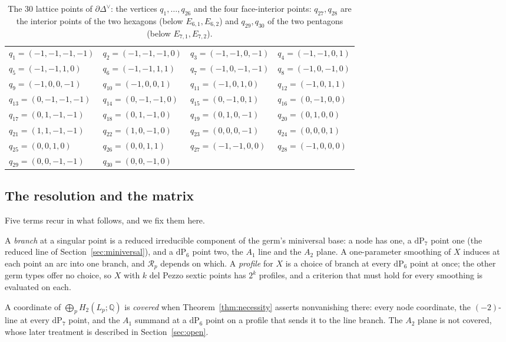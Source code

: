 \documentclass[11pt]{amsart}
\theoremstyle{definition}
\theoremstyle{remark}
\theoremstyle{plain}
\newcommand{\QQ}{\mathbb{Q}}
\newcommand{\Rsm}{\mathcal{R}}   %
\newcommand{\dP}{\mathrm{dP}}
\begin{document}
\begin{table}\centering
\caption{The $30$ lattice points of $\partial\Delta^{\vee}$: the
vertices $q_1,\dots,q_{26}$ and the four face-interior points:
$q_{27},q_{28}$ are the interior points of the two hexagons (below
$E_{6,1},E_{6,2}$) and $q_{29},q_{30}$ of the two pentagons (below
$E_{7,1},E_{7,2}$).}\label{tab:rays}
\begin{tabular}{llll}
\toprule
$q_1=(-1,-1,-1,-1)$ & $q_2=(-1,-1,-1,0)$ & $q_3=(-1,-1,0,-1)$ &
$q_4=(-1,-1,0,1)$\\
$q_5=(-1,-1,1,0)$ & $q_6=(-1,-1,1,1)$ & $q_7=(-1,0,-1,-1)$ &
$q_8=(-1,0,-1,0)$\\
$q_9=(-1,0,0,-1)$ & $q_{10}=(-1,0,0,1)$ & $q_{11}=(-1,0,1,0)$ &
$q_{12}=(-1,0,1,1)$\\
$q_{13}=(0,-1,-1,-1)$ & $q_{14}=(0,-1,-1,0)$ & $q_{15}=(0,-1,0,1)$ &
$q_{16}=(0,-1,0,0)$\\
$q_{17}=(0,1,-1,-1)$ & $q_{18}=(0,1,-1,0)$ & $q_{19}=(0,1,0,-1)$ &
$q_{20}=(0,1,0,0)$\\
$q_{21}=(1,1,-1,-1)$ & $q_{22}=(1,0,-1,0)$ & $q_{23}=(0,0,0,-1)$ &
$q_{24}=(0,0,0,1)$\\
$q_{25}=(0,0,1,0)$ & $q_{26}=(0,0,1,1)$ & $q_{27}=(-1,-1,0,0)$ &
$q_{28}=(-1,0,0,0)$\\
$q_{29}=(0,0,-1,-1)$ & $q_{30}=(0,0,-1,0)$ &&\\
\bottomrule
\end{tabular}
\end{table}

\subsection{The resolution and the matrix}\label{sec:matrix}
Five terms recur in what follows, and we fix them here.

A \emph{branch} at a singular point is a reduced irreducible component of the
germ's miniversal base: a node has one, a $\dP_7$ point one (the reduced line of
Section~\ref{sec:miniversal}), and a $\dP_6$ point two, the $A_1$ line and the
$A_2$ plane.  A one-parameter smoothing of $X$ induces at each point an arc into
one branch, and $\Rsm_p$ depends on which.  A \emph{profile} for $X$ is a choice
of branch at every $\dP_6$ point at once; the other germ types offer no choice,
so $X$ with $k$ del Pezzo sextic points has $2^{k}$ profiles, and a criterion
that must hold for every smoothing is evaluated on each.

A coordinate of $\bigoplus_pH_2(L_p;\QQ)$ is \emph{covered} when
Theorem~\ref{thm:necessity} asserts nonvanishing there: every node coordinate,
the $(-2)$-line at every $\dP_7$ point, and the $A_1$ summand at a $\dP_6$ point
on a profile that sends it to the line branch.  The $A_2$ plane is not covered,
whose later treatment is described in Section~\ref{sec:open}.
\end{document}
